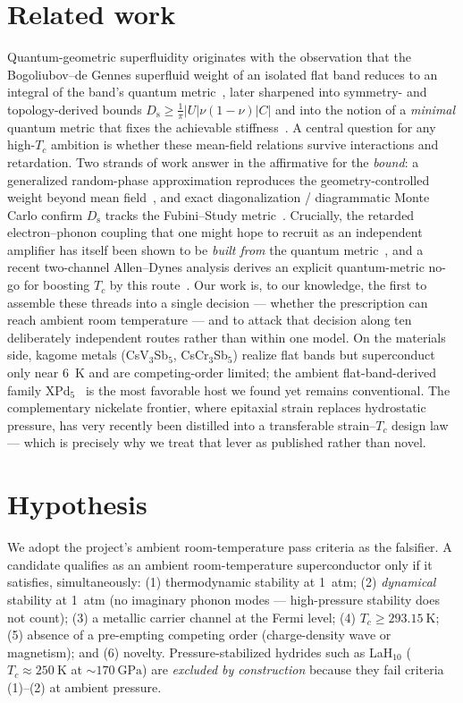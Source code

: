 \documentclass[11pt,a4paper]{article}
\newcommand{\Ds}{D_{\mathrm{s}}}
\begin{document}
\section{Related work}
\label{sec:related}
Quantum-geometric superfluidity originates with the observation that the Bogoliubov--de Gennes
superfluid weight of an isolated flat band reduces to an integral of the band's quantum
metric~\citep{peotta2015}, later sharpened into symmetry- and topology-derived bounds
$\Ds \ge \tfrac{1}{\pi}|U|\nu(1-\nu)|C|$ and into the notion of a \emph{minimal} quantum metric that
fixes the achievable stiffness~\citep{herzog2022,huhtinen2022}. A central question for any
high-$T_c$ ambition is whether these mean-field relations survive interactions and retardation. Two
strands of work answer in the affirmative for the \emph{bound}: a generalized random-phase
approximation reproduces the geometry-controlled weight beyond mean field~\citep{tam2024}, and exact
diagonalization / diagrammatic Monte Carlo confirm $\Ds$ tracks the Fubini--Study
metric~\citep{herzog2022}. Crucially, the retarded electron--phonon coupling that one might hope to
recruit as an independent amplifier has itself been shown to be \emph{built from} the quantum
metric~\citep{huhtinen2022}, and a recent two-channel Allen--Dynes analysis derives an explicit
quantum-metric no-go for boosting $T_c$ by this route~\citep{nogo2026}. Our work is, to our
knowledge, the first to assemble these threads into a single decision --- whether the prescription
can reach ambient room temperature --- and to attack that decision along ten deliberately
independent routes rather than within one model. On the materials side, kagome metals
(CsV$_3$Sb$_5$, CsCr$_3$Sb$_5$) realize flat bands but superconduct only near \SI{6}{\kelvin} and
are competing-order limited; the ambient flat-band-derived family XPd$_5$~\citep{xpd5} is the most
favorable host we found yet remains conventional. The complementary nickelate frontier, where
epitaxial strain replaces hydrostatic pressure, has very recently been distilled into a transferable
strain--$T_c$ design law~\citep{nickelate2026} --- which is precisely why we treat that lever as
published rather than novel.

\section{Hypothesis}
\label{sec:hyp}
We adopt the project's ambient room-temperature pass criteria as the falsifier. A candidate
qualifies as an ambient room-temperature superconductor only if it satisfies, simultaneously:
(1) thermodynamic stability at \SI{1}{atm}; (2) \emph{dynamical} stability at \SI{1}{atm} (no
imaginary phonon modes --- high-pressure stability does not count); (3) a metallic carrier channel
at the Fermi level; (4) $T_c \ge \SI{293.15}{\kelvin}$; (5) absence of a pre-empting competing
order (charge-density wave or magnetism); and (6) novelty. Pressure-stabilized hydrides such as
LaH$_{10}$ ($T_c\approx\SI{250}{\kelvin}$ at $\sim\SI{170}{\giga\pascal}$) are \emph{excluded by
construction} because they fail criteria (1)--(2) at ambient pressure.
\end{document}
